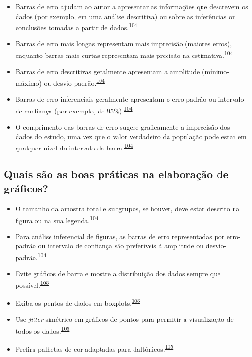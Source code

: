 \documentclass[
  a4paper,
]{book}
\begin{document}
\begin{itemize}
\item
  Barras de erro ajudam ao autor a apresentar as informações que descrevem os dados (por exemplo, em uma análise descritiva) ou sobre as inferências ou conclusões tomadas a partir de dados.\textsuperscript{\protect\hyperlink{ref-Cumming2007}{104}}
\item
  Barras de erro mais longas representam mais imprecisão (maiores erros), enquanto barras mais curtas representam mais precisão na estimativa.\textsuperscript{\protect\hyperlink{ref-Cumming2007}{104}}
\item
  Barras de erro descritivas geralmente apresentam a amplitude (mínimo-máximo) ou desvio-padrão.\textsuperscript{\protect\hyperlink{ref-Cumming2007}{104}}
\item
  Barras de erro inferenciais geralmente apresentam o erro-padrão ou intervalo de confiança (por exemplo, de 95\%).\textsuperscript{\protect\hyperlink{ref-Cumming2007}{104}}
\item
  O comprimento das barras de erro sugere graficamente a imprecisão dos dados do estudo, uma vez que o valor verdadeiro da população pode estar em qualquer nível do intervalo da barra.\textsuperscript{\protect\hyperlink{ref-Cumming2007}{104}}
\end{itemize}

\hypertarget{quais-suxe3o-as-boas-pruxe1ticas-na-elaborauxe7uxe3o-de-gruxe1ficos}{%
\subsection{Quais são as boas práticas na elaboração de gráficos?}\label{quais-suxe3o-as-boas-pruxe1ticas-na-elaborauxe7uxe3o-de-gruxe1ficos}}

\begin{itemize}
\item
  O tamanho da amostra total e subgrupos, se houver, deve estar descrito na figura ou na sua legenda.\textsuperscript{\protect\hyperlink{ref-Cumming2007}{104}}
\item
  Para análise inferencial de figuras, as barras de erro representadas por erro-padrão ou intervalo de confiança são preferíveis à amplitude ou desvio-padrão.\textsuperscript{\protect\hyperlink{ref-Cumming2007}{104}}
\item
  Evite gráficos de barra e mostre a distribuição dos dados sempre que possível.\textsuperscript{\protect\hyperlink{ref-Weissgerber2019}{105}}
\item
  Exiba os pontos de dados em boxplots.\textsuperscript{\protect\hyperlink{ref-Weissgerber2019}{105}}
\item
  Use \emph{jitter} simétrico em gráficos de pontos para permitir a visualização de todos os dados.\textsuperscript{\protect\hyperlink{ref-Weissgerber2019}{105}}
\item
  Prefira palhetas de cor adaptadas para daltônicos.\textsuperscript{\protect\hyperlink{ref-Weissgerber2019}{105}}
\end{itemize}
\end{document}
